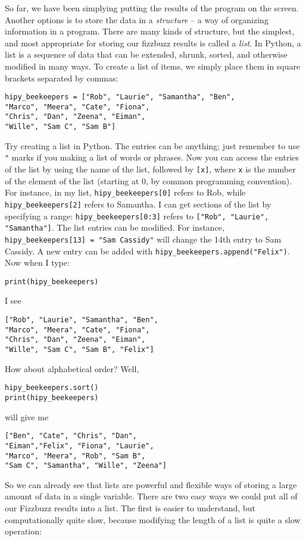 \documentclass[a4paper]{article}
\begin{document}
So far, we have been simplying putting the results of the program on the screen. Another options is to store the data in a \emph{structure} -- a way of organizing information in a program. There are many kinds of structure, but the simplest, and most appropriate for storing our fizzbuzz results is called a \emph{list}. In Python, a list is a sequence of data that can be extended, shrunk, sorted, and otherwise modified in many ways. To create a list of items, we simply place them in square brackets separated by commas:
\begin{lstlisting}
hipy_beekeepers = ["Rob", "Laurie", "Samantha", "Ben",
"Marco", "Meera", "Cate", "Fiona",
"Chris", "Dan", "Zeena", "Eiman", 
"Wille", "Sam C", "Sam B"]
\end{lstlisting}
Try creating a list in Python. The entries can be anything; just remember to use \verb|"| marks if you making a list of words or phrases. Now you can access the entries of the list by using the name of the list, followed by \verb|[x]|, where \verb|x| is the number of the element of the list (starting at 0, by common programming convention). For instance, in my list, \verb|hipy_beekeepers[0]| refers to Rob, while \verb|hipy_beekeepers[2]| refers to Samantha. I can get sections of the list by specifying a range: \verb|hipy_beekeepers[0:3]| refers to \verb|["Rob", "Laurie", "Samantha"]|. The list entries can be modified. For instance, \verb|hipy_beekeepers[13] = "Sam Cassidy"| will change the 14th entry to Sam Cassidy. A new entry can be added with \verb|hipy_beekeepers.append("Felix")|. Now when I type:
\begin{lstlisting}
print(hipy_beekeepers)
\end{lstlisting}
\noindent I see
\begin{lstlisting}
["Rob", "Laurie", "Samantha", "Ben",
"Marco", "Meera", "Cate", "Fiona",
"Chris", "Dan", "Zeena", "Eiman", 
"Wille", "Sam C", "Sam B", "Felix"]
\end{lstlisting}
How about alphabetical order? Well,
\begin{lstlisting}
hipy_beekeepers.sort()
print(hipy_beekeepers)
\end{lstlisting}
\noindent will give me
\begin{lstlisting}
["Ben", "Cate", "Chris", "Dan",
"Eiman","Felix", "Fiona", "Laurie", 
"Marco", "Meera", "Rob", "Sam B",
"Sam C", "Samantha", "Wille", "Zeena"]
\end{lstlisting}
So we can already see that lists are powerful and flexible ways of storing a large amount of data in a single variable. There are two easy ways we could put all of our Fizzbuzz results into a list. The first is easier to understand, but computationally quite slow, because modifying the length of a list is quite a slow operation:
\end{document}
